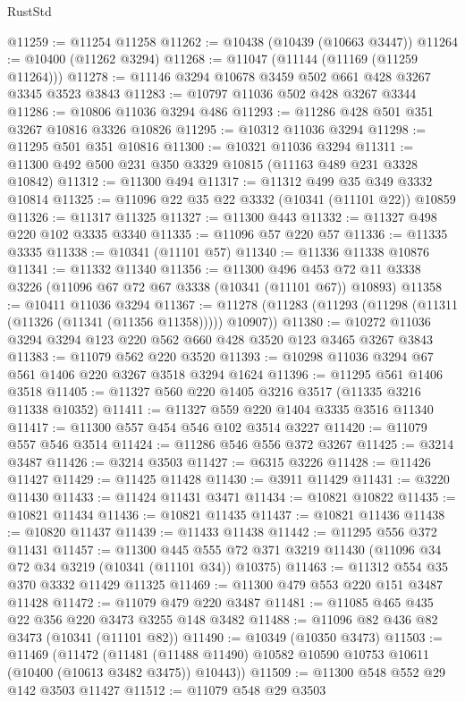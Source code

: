 \begin{lexlean}{RustStd}
\begin{coremodule}
{\begin{coremodule}
{{{{{{{{{{{{{{{{{{{{{{{{{@11259 := @11254 @11258
@11262 := @10438 (@10439 (@10663 @3447))
@11264 := @10400 (@11262 @3294)
@11268 := @11047 (@11144 (@11169 (@11259 @11264)))
@11278 := @11146 @3294 @10678 @3459 @502 @661 @428 @3267 @3345 @3523 @3843
@11283 := @10797 @11036 @502 @428 @3267 @3344
@11286 := @10806 @11036 @3294 @486
@11293 := @11286 @428 @501 @351 @3267 @10816 @3326 @10826
@11295 := @10312 @11036 @3294
@11298 := @11295 @501 @351 @10816
@11300 := @10321 @11036 @3294
@11311 := @11300 @492 @500 @231 @350 @3329 @10815 (@11163 @489 @231 @3328 @10842)
@11312 := @11300 @494
@11317 := @11312 @499 @35 @349 @3332 @10814
@11325 := @11096 @22 @35 @22 @3332 (@10341 (@11101 @22)) @10859
@11326 := @11317 @11325
@11327 := @11300 @443
@11332 := @11327 @498 @220 @102 @3335 @3340
@11335 := @11096 @57 @220 @57
@11336 := @11335 @3335
@11338 := @10341 (@11101 @57)
@11340 := @11336 @11338 @10876
@11341 := @11332 @11340
@11356 := @11300
    @496
    @453
    @72
    @11
    @3338
    @3226
    (@11096 @67 @72 @67 @3338 (@10341 (@11101 @67)) @10893)
@11358 := @10411 @11036 @3294
@11367 := @11278 (@11283 (@11293 (@11298 (@11311 (@11326 (@11341 (@11356 @11358))))) @10907))
@11380 := @10272 @11036 @3294 @3294 @123 @220 @562 @660 @428 @3520 @123 @3465 @3267 @3843
@11383 := @11079 @562 @220 @3520
@11393 := @10298 @11036 @3294 @67 @561 @1406 @220 @3267 @3518 @3294 @1624
@11396 := @11295 @561 @1406 @3518
@11405 := @11327 @560 @220 @1405 @3216 @3517 (@11335 @3216 @11338 @10352)
@11411 := @11327 @559 @220 @1404 @3335 @3516 @11340
@11417 := @11300 @557 @454 @546 @102 @3514 @3227
@11420 := @11079 @557 @546 @3514
@11424 := @11286 @546 @556 @372 @3267
@11425 := @3214 @3487
@11426 := @3214 @3503
@11427 := @6315 @3226
@11428 := @11426 @11427
@11429 := @11425 @11428
@11430 := @3911 @11429
@11431 := @3220 @11430
@11433 := @11424 @11431 @3471
@11434 := @10821 @10822
@11435 := @10821 @11434
@11436 := @10821 @11435
@11437 := @10821 @11436
@11438 := @10820 @11437
@11439 := @11433 @11438
@11442 := @11295 @556 @372 @11431
@11457 := @11300
    @445
    @555
    @72
    @371
    @3219
    @11430
    (@11096 @34 @72 @34 @3219 (@10341 (@11101 @34)) @10375)
@11463 := @11312 @554 @35 @370 @3332 @11429 @11325
@11469 := @11300 @479 @553 @220 @151 @3487 @11428
@11472 := @11079 @479 @220 @3487
@11481 := @11085 @465 @435 @22 @356 @220 @3473 @3255 @148 @3482
@11488 := @11096 @82 @436 @82 @3473 (@10341 (@11101 @82))
@11490 := @10349 (@10350 @3473)
@11503 := @11469
    (@11472
      (@11481 (@11488 @11490) @10582 @10590 @10753 @10611 (@10400 (@10613 @3482 @3475)) @10443))
@11509 := @11300 @548 @552 @29 @142 @3503 @11427
@11512 := @11079 @548 @29 @3503
}}}}}}}}}}}}}}}}}}}}}}}}}
\end{coremodule}}
\end{coremodule}
\end{lexlean}
